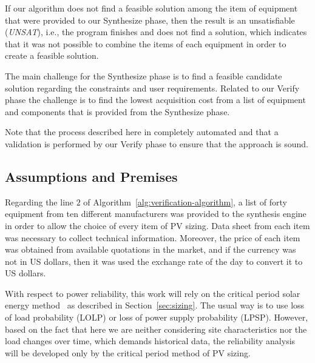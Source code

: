 \documentclass[review]{elsarticle}
\begin{document}
If our algorithm does not find a feasible solution among the item of equipment that 
were provided to our {\sc Synthesize} phase,  then the result is an unsatisfiable (\textit{UNSAT}), i.e., 
the program finishes and does not find a solution, which indicates that it 
was not possible to combine the items of each equipment in order to create a feasible solution. 

The main challenge for the {\sc Synthesize} phase is to find a feasible candidate 
solution regarding the constraints and user requirements. Related to our {\sc Verify} 
phase the challenge is to find the lowest acquisition cost from a list of equipment and 
components that is provided from the {\sc Synthesize} phase. 

Note that the process described here in completely automated and that a validation is performed 
by our {\sc Verify} phase to ensure that the approach is sound.

\subsection{Assumptions and Premises}

Regarding the line $2$ of Algorithm~\ref{alg:verification-algorithm}, 
a list of forty equipment from ten different manufacturers was provided 
to the synthesis engine in order to allow the choice of every item 
of PV sizing. Data sheet from each item was necessary to collect 
technical information. Moreover, the price of each item was obtained 
from available quotations in the market, and if the currency was not in US dollars, 
then it was used the exchange rate of the day to convert it to US dollars.

With respect to power reliability, this work will rely on the critical period solar 
energy method~\cite{Pinho} as described in Section~\ref{sec:sizing}. 
The usual way is to use loss of load probability (LOLP) or loss of power 
supply probability (LPSP). However, based on the fact that here we 
are neither considering site characteristics nor the load changes over time, 
which demands historical data, the reliability analysis will be developed only 
by the critical period method of PV sizing.
\end{document}
